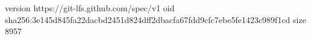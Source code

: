 version https://git-lfs.github.com/spec/v1
oid sha256:3e145d845fa22dacbd2451d824dff2dbacfa67fdd9cfc7ebe5fe1423c989f1cd
size 8957
